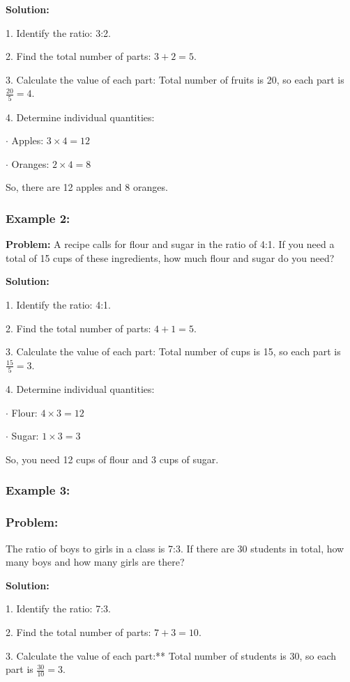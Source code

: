 \documentclass{article}
\begin{document}
\begin{spacing}{1.25}
\begin{enumerate}
\textbf{Solution:}

1. Identify the ratio: 3:2.

2. Find the total number of parts: $3 + 2 = 5.$

3. Calculate the value of each part: Total number of fruits is 20, so each part is $\frac{20}{5} = 4.$

4. Determine individual quantities:
   
   $\cdot$ Apples: $3 \times 4 = 12$
   
   $\cdot$ Oranges: $2 \times 4 = 8$

So, there are 12 apples and 8 oranges.

\subsubsection*{Example 2:}

\textbf{Problem:} A recipe calls for flour and sugar in the ratio of 4:1. If you need a total of 15 cups of these ingredients, how much flour and sugar do you need?

\textbf{Solution:}

1. Identify the ratio: 4:1.

2. Find the total number of parts: $4 + 1 = 5.$

3. Calculate the value of each part: Total number of cups is 15, so each part is $\frac{15}{5} = 3.$

4. Determine individual quantities:

$\cdot$ Flour: $4 \times 3 = 12$

$\cdot$ Sugar: $1 \times 3 = 3$

So, you need 12 cups of flour and 3 cups of sugar.

\subsubsection*{Example 3:}

\subsubsection*{Problem:}
The ratio of boys to girls in a class is 7:3. If there are 30 students in total, how many boys and how many girls are there?

\textbf{Solution:}

1. Identify the ratio: 7:3.

2. Find the total number of parts: $7 + 3 = 10.$

3. Calculate the value of each part:** Total number of students is 30, so each part is $\frac{30}{10} = 3.$


\end{enumerate}
\end{spacing}
\end{document}

